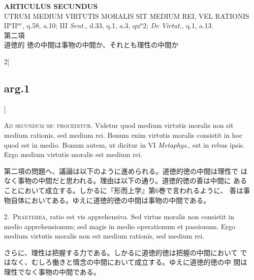 \documentclass[paper=a4paper,fontsize=10pt,jafontsize=9pt,titlepage]{jlreq}
\begin{document}
\newpage
{}
{}
\setcounter{section}{2}
\setcounter{subsection}{0}


\begin{center}
{\Large {\bfseries ARTICULUS SECUNDUS}}\\ {\large UTRUM MEDIUM VIRTUTIS
MORALIS SIT MEDIUM REI, VEL RATIONIS}\\{\footnotesize
II$^{a}$II$^{ae}$, q.58, a.10; III {\itshape Sent.}, d.33, q.1, a.3,
qu$^{a}$2; {\itshape De Virtut.}, q.1, a.13.}\\ {\Large 第二項\\道徳的
徳の中間は事物の中間か、それとも理性の中間か}
\end{center}

\begin{paracol}{2}[\subsection{arg.1}]

{\scshape Ad secundum sic proceditur}. Videtur quod medium virtutis
moralis non sit medium rationis, sed medium rei. Bonum enim virtutis
moralis consistit in hoc quod est in medio. Bonum autem, ut dicitur in
VI {\itshape Metaphys}., est in rebus ipsis. Ergo medium virtutis
moralis est medium rei.

\switchcolumn

第二項の問題へ、議論は以下のように進められる。道徳的徳の中間は理性で
 はなく事物の中間だと思われる。理由は以下の通り。道徳的徳の善は中間に
 あることにおいて成立する。しかるに『形而上学』第6巻で言われるように、
 善は事物自体においてある。ゆえに道徳的徳の中間は事物の中間である。


2.~{\scshape Praeterea}, ratio est vis apprehensiva. Sed virtus
moralis non consistit in medio apprehensionum; sed magis in medio
operationum et passionum. Ergo medium virtutis moralis non est medium
rationis, sed medium rei.

\switchcolumn

さらに、理性は把握する力である。しかるに道徳的徳は把握の中間において
 ではなく、むしろ働きと情念の中間において成立する。ゆえに道徳的徳の中
 間は理性でなく事物の中間である。


\end{paracol}
\end{document}
